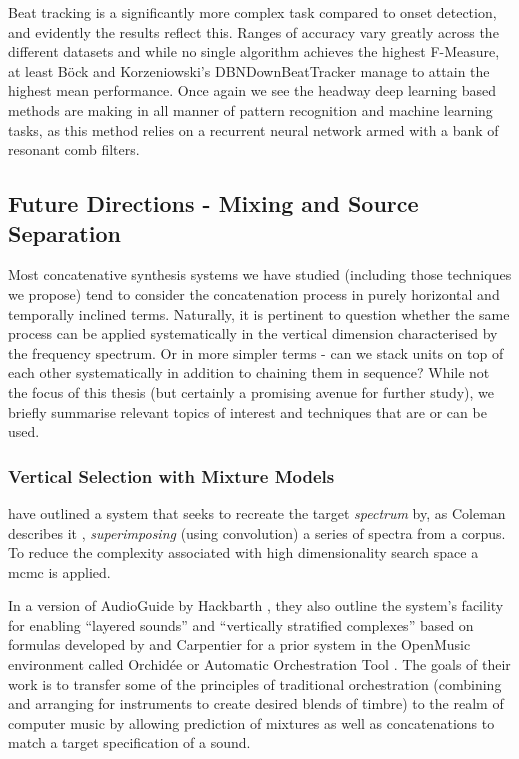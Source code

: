 {{Beat tracking is a significantly more complex task compared to onset detection, and evidently the results reflect this. Ranges of accuracy vary greatly across the different datasets and while no single algorithm achieves the highest F-Measure, at least Böck and Korzeniowski’s DBNDownBeatTracker manage to attain the highest mean performance. Once again we see the headway deep learning based methods are making in all manner of pattern recognition and machine learning tasks, as this method relies on a recurrent neural network armed with a bank of resonant comb filters. 

\subsection{Future Directions - Mixing and Source Separation}

Most concatenative synthesis systems we have studied (including those techniques we propose) tend to consider the concatenation process in purely horizontal and temporally inclined terms.  Naturally, it is pertinent to question whether the same process can be applied systematically in the vertical dimension characterised by the frequency spectrum. Or in more simpler terms - can we stack units on top of each other systematically in addition to chaining them in sequence? While not the focus of this thesis (but certainly a promising avenue for further study), we briefly summarise relevant topics of interest and  techniques that are or can be used.

\subsubsection{Vertical Selection with Mixture Models}

\cite{Hoffman2009} have outlined a system that seeks to recreate the target \textit{spectrum} by, as Coleman describes it \citeyearpar{Coleman2010}, \textit{superimposing} (using convolution) a series of spectra from a corpus. To reduce the complexity associated with high dimensionality search space a \acrfull{mcmc} is applied. 

In a version of AudioGuide by Hackbarth \citep{Hackbarth2013}, they also outline the system's facility for enabling ``layered sounds'' and ``vertically stratified complexes'' based on formulas developed by \cite{Tardieu2008} and Carpentier for a prior system in the OpenMusic environment called Orchidée or Automatic Orchestration Tool \cite{Carpentier2010}. The goals of their work is to transfer some of the principles of traditional orchestration (combining and arranging for instruments to create desired blends of timbre) to the realm of computer music by allowing prediction of mixtures as well as concatenations to match a target specification of a sound.

}}
